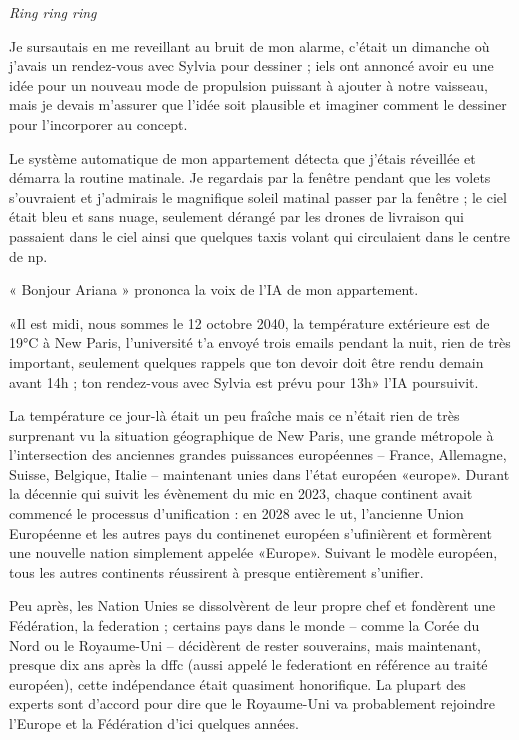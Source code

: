 \documentclass[12pt,colorlinks,a4paper]{book}
\begin{document}
\textit{Ring ring ring}

Je sursautais en me reveillant au bruit de mon alarme, c'était un
dimanche où j'avais un rendez-vous avec Sylvia pour dessiner ; iels
ont annoncé avoir eu une idée pour un nouveau mode de propulsion puissant
à ajouter à notre vaisseau, mais je devais m'assurer que l'idée soit
plausible et imaginer comment le dessiner pour l'incorporer au concept.\par

\bigskip
Le système automatique de mon appartement détecta que j'étais réveillée
et démarra la routine matinale. Je regardais par la fenêtre pendant
que les volets s'ouvraient et j'admirais le magnifique soleil matinal
passer par la fenêtre ; le ciel était bleu et sans nuage, seulement
dérangé par les drones de livraison qui passaient dans le ciel ainsi
que quelques taxis volant qui circulaient dans le centre de \gls{np}. \par

\bigskip
« Bonjour Ariana » prononca la voix de l'IA de mon appartement.\par

\bigskip
«Il est midi, nous sommes le 12 octobre 2040, la température extérieure
est de 19°C à New Paris, l'université t'a envoyé trois emails pendant
la nuit, rien de très important, seulement quelques rappels que ton
devoir doit être rendu demain avant 14h ; ton rendez-vous avec Sylvia
est prévu pour 13h» l'IA poursuivit.\par

\bigskip

La température ce jour-là était un peu fraîche mais ce n'était rien
de très surprenant vu la situation géographique de New Paris, une
grande métropole à l'intersection des anciennes grandes puissances
européennes -- France, Allemagne, Suisse, Belgique, Italie -- maintenant
unies dans l'état européen «\gls{europe}». Durant la décennie
qui suivit les évènement du \gls{mic} en 2023, chaque continent
avait commencé le processus d'unification : en 2028 avec le \gls{ut},
l'ancienne Union Européenne et les autres pays du continenet européen
s'ufinièrent et formèrent une nouvelle nation simplement appelée «Europe».
Suivant le modèle européen, tous les autres continents réussirent
à presque entièrement s'unifier.\par

\bigskip

Peu après, les Nation Unies se dissolvèrent de leur propre chef et
fondèrent une Fédération, la \gls{federation} ; certains pays dans
le monde -- comme la Corée du Nord ou le Royaume-Uni -- décidèrent
de rester souverains, mais maintenant, presque dix ans après la \gls{dffc}
(aussi appelé le \gls{federationt} en référence au traité européen),
cette indépendance était quasiment honorifique. La plupart des experts
sont d'accord pour dire que le Royaume-Uni va probablement rejoindre
l'Europe et la Fédération d'ici quelques années.\par
\end{document}
